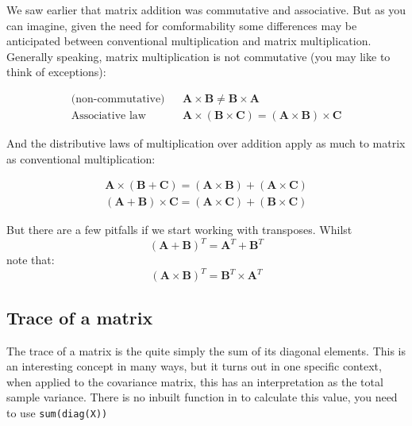 
We saw earlier that matrix addition was commutative and associative.   But as you can imagine, given the need for comformability some differences may be anticipated between conventional multiplication and matrix multiplication.   Generally speaking, matrix multiplication is not commutative (you may like to think of exceptions):

\begin{eqnarray*}
\mbox{(non-commutative)} &&\mathbf{A} \times \mathbf{B} \neq \mathbf{B} \times \mathbf{A}\ \\
\mbox{Associative law} && \mathbf{A} \times (\mathbf{B} \times \mathbf{C}) = (\mathbf{A} \times \mathbf{B}) \times \mathbf{C}
\end{eqnarray*}

And the distributive laws of multiplication over addition apply as much to matrix as conventional multiplication:

\begin{eqnarray*}
\mathbf{A} \times (\mathbf{B} + \mathbf{C}) = (\mathbf{A} \times \mathbf{B}) + (\mathbf{A} \times \mathbf{C}) \\
(\mathbf{A} + \mathbf{B}) \times \mathbf{C} = (\mathbf{A} \times \mathbf{C}) + (\mathbf{B} \times \mathbf{C})
\end{eqnarray*}


But there are a few pitfalls if we start working with transposes.   Whilst
\begin{displaymath}
(\mathbf{A} + \mathbf{B})^{T} = \mathbf{A}^{T} + \mathbf{B}^{T}
\end{displaymath}
note that:
\begin{displaymath}
(\mathbf{A} \times \mathbf{B})^{T} = \mathbf{B}^{T} \times \mathbf{A}^{T}
\end{displaymath}



\subsection{Trace of a matrix}

The trace of a matrix is the quite simply the sum of its diagonal elements.   This is an interesting concept in many ways, but it turns out in one specific context, when applied to the covariance matrix, this has an interpretation as the total sample variance.   There is no inbuilt function in \R to calculate this value, you need to use \verb+sum(diag(X))+

